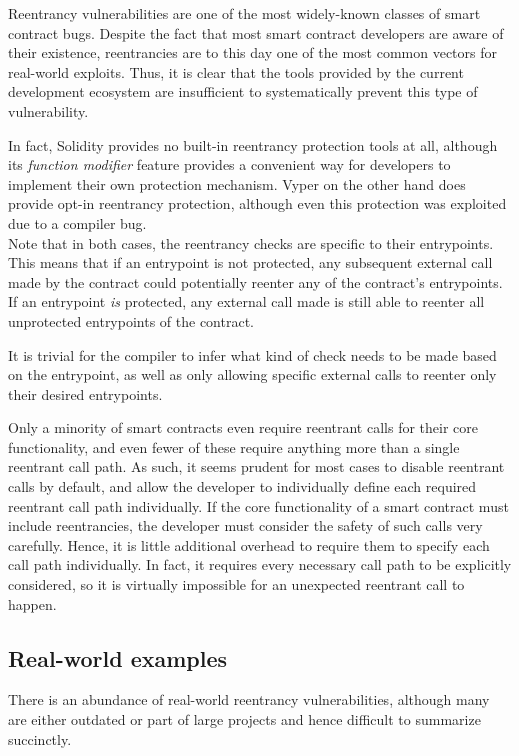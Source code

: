 Reentrancy vulnerabilities are one of the most widely-known classes of smart contract bugs. Despite the fact that most smart contract developers are aware of their existence, reentrancies are to this day one of the most common vectors for real-world exploits. Thus, it is clear that the tools provided by the current development ecosystem are insufficient to systematically prevent this type of vulnerability.

In fact, Solidity provides no built-in reentrancy protection tools at all, although its \textit{function modifier} feature provides a convenient way for developers to implement their own protection mechanism. Vyper on the other hand does provide opt-in reentrancy protection, although even this protection was exploited due to a compiler bug.\\
Note that in both cases, the reentrancy checks are specific to their entrypoints. This means that if an entrypoint is not protected, any subsequent external call made by the contract could potentially reenter any of the contract's entrypoints. If an entrypoint \textit{is} protected, any external call made is still able to reenter all unprotected entrypoints of the contract.

It is trivial for the compiler to infer what kind of check needs to be made based on the entrypoint, as well as only allowing specific external calls to reenter only their desired entrypoints.

Only a minority of smart contracts even require reentrant calls for their core functionality, and even fewer of these require anything more than a single reentrant call path. As such, it seems prudent for most cases to disable reentrant calls by default, and allow the developer to individually define each required reentrant call path individually. If the core functionality of a smart contract must include reentrancies, the developer must consider the safety of such calls very carefully. Hence, it is little additional overhead to require them to specify each call path individually. In fact, it requires every necessary call path to be explicitly considered, so it is virtually impossible for an unexpected reentrant call to happen.

\subsection{Real-world examples}

There is an abundance of real-world reentrancy vulnerabilities, although many are either outdated or part of large projects and hence difficult to summarize succinctly.

